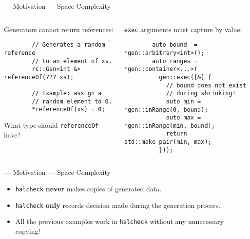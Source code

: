 \begin{frame}[fragile]{\halcheck{} --- Motivation --- Space Complexity}
  \begin{columns}[t]
    \begin{block}{Generators cannot return references:}
      \begin{verbatim}
        // Generates a random reference
        // to an element of xs.
        rc::Gen<int &> referenceOf(??? xs);

        // Example: assign a
        // random element to 0.
        *referenceOf(xs) = 0;
      \end{verbatim}

      What type should \texttt{referenceOf} have?
    \end{block}

    \pause{}

    \begin{block}{\texttt{exec} arguments must capture by value:}
      \begin{verbatim}
        auto bound  = *gen::arbitrary<int>();
        auto ranges = *gen::container<...>(
          gen::exec([&] {
            // bound does not exist
            // during shrinking!
            auto min = *gen::inRange(0, bound);
            auto max = *gen::inRange(min, bound);
            return std::make_pair(min, max);
          }));
      \end{verbatim}
    \end{block}
  \end{columns}
\end{frame}

\begin{frame}{\halcheck{} --- Motivation --- Space Complexity}
  \begin{itemize}
    \item \texttt{halcheck} \textbf{never} makes copies of generated data.
    \item \texttt{halcheck} \textbf{only} records decision made during the generation process.
    \item All the previous examples work in \texttt{halcheck} without any unnecessary copying!
  \end{itemize}
\end{frame}

